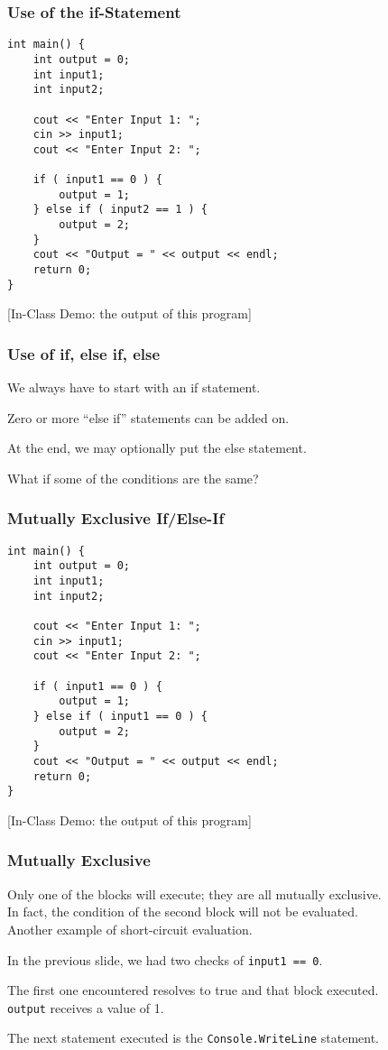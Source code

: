 \begin{frame}[fragile]
\frametitle{Use of the if-Statement}

{\scriptsize
\begin{verbatim}
int main() {
    int output = 0;
    int input1;
    int input2;
    
    cout << "Enter Input 1: ";
    cin >> input1;
    cout << "Enter Input 2: ";
    
    if ( input1 == 0 ) {
        output = 1; 
    } else if ( input2 == 1 ) {				
        output = 2; 			
    }				
    cout << "Output = " << output << endl;
    return 0;    
}
\end{verbatim}
}

[In-Class Demo: the output of this program]

\end{frame}

\begin{frame}
\frametitle{Use of if, else if, else}

We always have to start with an if statement.

Zero or more ``else if'' statements can be added on.

At the end, we may optionally put the else statement.

What if some of the conditions are the same?

\end{frame}

\begin{frame}[fragile]
\frametitle{Mutually Exclusive If/Else-If}

{\scriptsize
\begin{verbatim}
int main() {
    int output = 0;
    int input1;
    int input2;
    
    cout << "Enter Input 1: ";
    cin >> input1;
    cout << "Enter Input 2: ";
    
    if ( input1 == 0 ) {
        output = 1; 
    } else if ( input1 == 0 ) {				
        output = 2; 			
    }				
    cout << "Output = " << output << endl;
    return 0;    
}
\end{verbatim}
}

[In-Class Demo: the output of this program]

\end{frame}

\begin{frame}
\frametitle{Mutually Exclusive}

Only one of the blocks will execute; they are all mutually exclusive.\\
\quad In fact, the condition of the second block will not be evaluated.\\
\quad Another example of short-circuit evaluation.

In the previous slide, we had two checks of \texttt{input1 == 0}.

The first one encountered resolves to true and that block executed.\\
\quad \texttt{output} receives a value of 1.

The next statement executed is the \texttt{Console.WriteLine} statement.

\end{frame}

